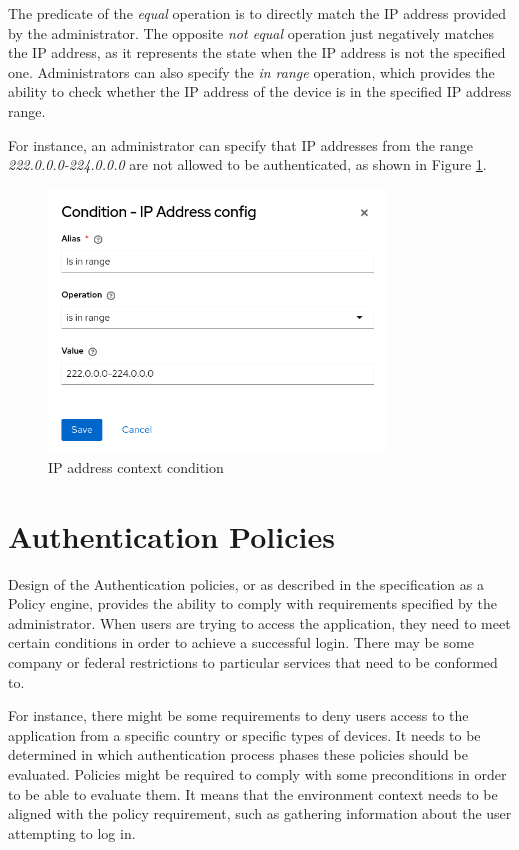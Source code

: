 The predicate of the \textit{equal} operation is to directly match the IP address provided by the administrator.
The opposite \textit{not equal} operation just negatively matches the IP address, as it represents the state when the IP address is not the specified one.
Administrators can also specify the \textit{in range} operation, which provides the ability to check whether the IP address of the device is in the specified IP address range.

For instance, an administrator can specify that IP addresses from the range \textit{222.0.0.0-224.0.0.0} are not allowed to be authenticated, as shown in Figure \ref{fig:design-user-context-ip-addr-condition}.

\begin{figure}[htbp]
  \centering
  \includegraphics[width=0.8\textwidth]{img/sections/5-design/ip-address-condition.png}
  \caption{IP address context condition}
  \label{fig:design-user-context-ip-addr-condition}
\end{figure}

\newpage

\section{Authentication Policies} \label{authentication-policies}
Design of the Authentication policies, or as described in the specification as a Policy engine, provides the ability to comply with requirements specified by the administrator.
When users are trying to access the application, they need to meet certain conditions in order to achieve a successful login.
There may be some company or federal restrictions to particular services that need to be conformed to.

For instance, there might be some requirements to deny users access to the application from a specific country or specific types of devices.
It needs to be determined in which authentication process phases these policies should be evaluated.
Policies might be required to comply with some preconditions in order to be able to evaluate them.
It means that the environment context needs to be aligned with the policy requirement, such as gathering information about the user attempting to log in.

